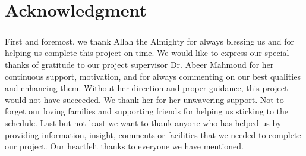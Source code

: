 \documentclass[12pt, oneside, a4paper]{book}
\begin{document}
	\chapter*{Acknowledgment}
	\label{sec:ack}
	\paragraph{} First and foremost, we thank Allah the Almighty for always blessing us and for helping us complete this project on time. We would like to express our special thanks of gratitude to our project supervisor Dr. Abeer Mahmoud for her continuous support, motivation, and for always commenting on our best qualities and enhancing them. Without her direction and proper guidance, this project would not have succeeded. We thank her for her unwavering support. Not to forget our loving families and supporting friends for helping us sticking to the schedule. Last but not least we want to thank anyone who has helped us by providing information, insight, comments or facilities that we needed to complete our project. Our heartfelt thanks to everyone we have mentioned.




	\tableofcontents
	\newpage	
	\doublespacing
	\newpage
	
	\listoftables
	\newpage
	
	\listoffigures
	\newpage
	
\end{document}
